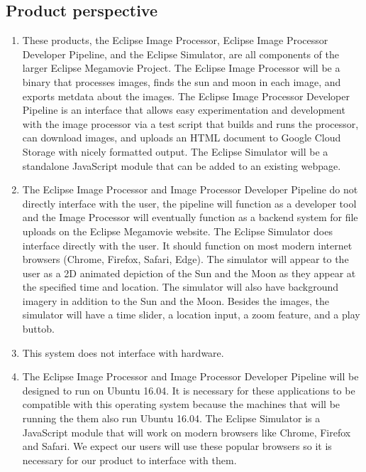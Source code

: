 \documentclass[10pt, onecolumn, draftclsnofoot, letterpaper, compsoc]{IEEEtran}
\begin{document}
\subsection{Product perspective}
	\begin{enumerate}
		\item These products, the Eclipse Image Processor, Eclipse Image
		Processor Developer Pipeline, and the Eclipse Simulator, are all components of
		the larger Eclipse Megamovie Project. The Eclipse Image Processor will be
		a binary that processes images, finds the sun and moon in each image, and
        exports metdata about the images. The Eclipse Image Processor Developer
        Pipeline is an interface that allows easy experimentation and development
        with the image processor via a test script that builds and runs the processor, can
        download images, and uploads an HTML document to Google Cloud Storage
        with nicely formatted output. The Eclipse Simulator will be a standalone
        JavaScript module that can be added to an existing webpage.

		\item The Eclipse Image Processor and Image Processor Developer Pipeline
		do not directly interface with the user, the pipeline will function as a
        developer tool and the Image Processor will eventually function as a backend
        system for file uploads on the Eclipse Megamovie website.
		The Eclipse Simulator does interface
		directly with the user. It should function on most modern
		internet browsers (Chrome, Firefox, Safari, Edge). The simulator
		will appear to the user as a 2D animated depiction of the
		Sun and the Moon as they appear at the specified time and
		location. The simulator will also have background imagery in
		addition to the Sun and the Moon. Besides the images, the
		simulator will have a time slider, a location input, a zoom feature,
        and a play buttob.

		\item This system does not interface with hardware.

		\item The Eclipse Image Processor and Image Processor Developer Pipeline
		will be designed to run on Ubuntu 16.04. It is necessary for these
		applications to be compatible with this operating system because
		the machines that will be running the them also run Ubuntu 16.04. The Eclipse
		Simulator is a JavaScript module that will work on modern
		browsers like Chrome, Firefox and Safari. We expect our
		users will use these popular browsers so it is necessary
		for our product to interface with them.
	\end{enumerate}
\end{document}

